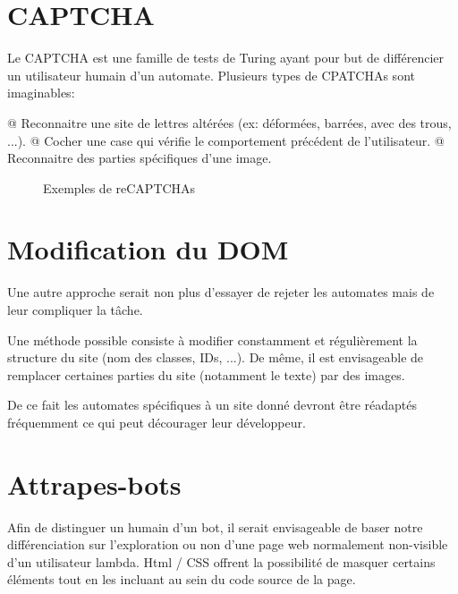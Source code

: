 \documentclass[hideweeklyreports,noposter]{polytech/polytech}
\begin{document}
		\section{CAPTCHA}
			Le CAPTCHA est une famille de tests de Turing ayant pour but de différencier un utilisateur humain d'un automate.
			Plusieurs types de CPATCHAs sont imaginables:
			\begin{easylist}[itemize]
				@ Reconnaitre une site de lettres altérées (ex: déformées, barrées, avec des trous, ...).
				@ Cocher une case qui vérifie le comportement précédent de l'utilisateur.
				@ Reconnaitre des parties spécifiques d'une image.
			\end{easylist}
			
			\begin{figure}[H]
				\begin{minipage}{0.5\textwidth}
				\end{minipage}
				\begin{minipage}{0.49\textwidth}
				\end{minipage}
				\caption{Exemples de reCAPTCHAs}
			\end{figure}

		\section{Modification du DOM}
			Une autre approche serait non plus d'essayer de rejeter les automates mais de leur compliquer la tâche.
			
			Une méthode possible consiste à modifier constamment et régulièrement la structure du site (nom des classes, IDs, ...).
			De même, il est envisageable de remplacer certaines parties du site (notamment le texte) par des images.
			
			De ce fait les automates spécifiques à un site donné devront être réadaptés fréquemment ce qui peut décourager leur développeur.

        \section{Attrapes-bots}
            Afin de distinguer un humain d'un bot, il serait envisageable de baser notre différenciation sur l'exploration ou non d'une page web normalement non-visible d'un utilisateur lambda.
            Html / CSS offrent la possibilité de masquer certains éléments tout en les incluant au sein du code source de la page.
            
\end{document}

